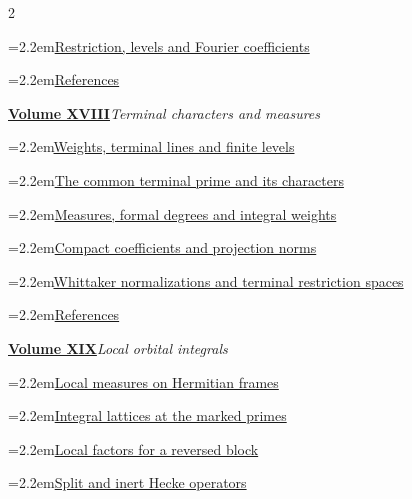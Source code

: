 \documentclass[a4paper,11pt]{article}
\theoremstyle{definition}
\theoremstyle{remark}
\numberwithin{equation}{section}
\begin{document}
\begin{multicols}{2}
\begin{minipage}{\linewidth}
\noindent\hangindent=2.2em\hyperref[nav:g-VII-4]{Restriction, levels and Fourier coefficients}\par
\noindent\hangindent=2.2em\hyperref[nav:bibliography-XVII]{References}\par
\end{minipage}\par\medskip
\noindent\begin{minipage}{\linewidth}\raggedright
\textbf{\hyperref[nav:volume-XVIII]{Volume XVIII}}\enspace\emph{Terminal characters and measures}\par\smallskip
\noindent\hangindent=2.2em\hyperref[nav:g-VIII-0]{Weights, terminal lines and finite levels}\par
\noindent\hangindent=2.2em\hyperref[nav:g-VIII-1]{The common terminal prime and its characters}\par
\noindent\hangindent=2.2em\hyperref[nav:g-VIII-2]{Measures, formal degrees and integral weights}\par
\noindent\hangindent=2.2em\hyperref[nav:g-VIII-3]{Compact coefficients and projection norms}\par
\noindent\hangindent=2.2em\hyperref[nav:terminal-whittaker]{Whittaker normalizations and terminal restriction spaces}\par
\noindent\hangindent=2.2em\hyperref[nav:bibliography-XVIII]{References}\par
\end{minipage}\par\medskip
\noindent\begin{minipage}{\linewidth}\raggedright
\textbf{\hyperref[nav:volume-XIX]{Volume XIX}}\enspace\emph{Local orbital integrals}\par\smallskip
\noindent\hangindent=2.2em\hyperref[nav:g-IX-0]{Local measures on Hermitian frames}\par
\noindent\hangindent=2.2em\hyperref[nav:g-IX-1]{Integral lattices at the marked primes}\par
\noindent\hangindent=2.2em\hyperref[nav:g-IX-2]{Local factors for a reversed block}\par
\noindent\hangindent=2.2em\hyperref[nav:g-IX-3]{Split and inert Hecke operators}\par

\end{minipage}
\end{multicols}
\end{document}
